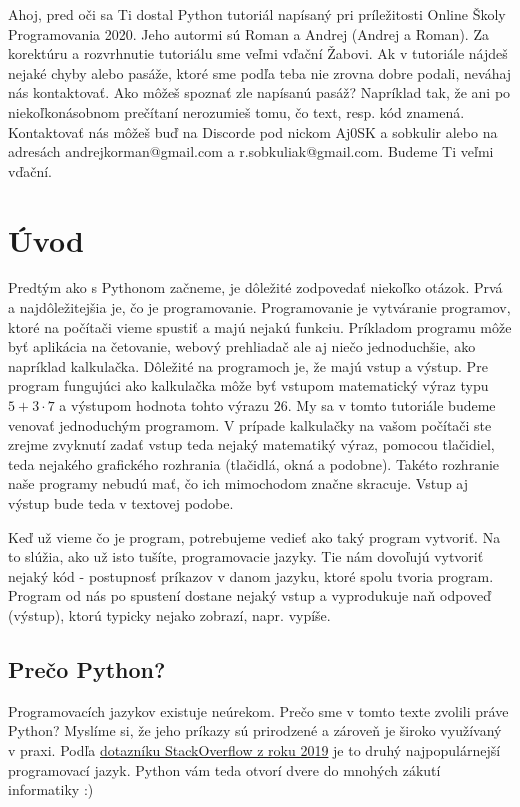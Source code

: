 

\usepackage{hyperref}
\hypersetup{
    colorlinks=true,
    linkcolor=blue,
    filecolor=magenta,      
    urlcolor=blue,
}


\tableofcontents
\newpage

Ahoj, pred oči sa Ti dostal Python tutoriál napísaný pri príležitosti Online Školy Programovania 2020. Jeho autormi sú Roman a Andrej (Andrej a Roman). Za korektúru a rozvrhnutie tutoriálu sme veľmi vďační Žabovi. Ak v tutoriále nájdeš nejaké chyby alebo pasáže, ktoré sme podľa teba nie zrovna dobre podali, neváhaj nás kontaktovať. Ako môžeš spoznať zle napísanú pasáž? Napríklad tak, že ani po niekoľkonásobnom prečítaní nerozumieš tomu, čo text, resp. kód znamená. Kontaktovať nás môžeš buď na Discorde pod nickom Aj0SK a sobkulir alebo na adresách andrejkorman@gmail.com a r.sobkuliak@gmail.com. Budeme Ti veľmi vďační.

\section{Úvod}
Predtým ako s Pythonom začneme, je dôležité zodpovedať niekoľko otázok. Prvá a najdôležitejšia je, čo je programovanie. Programovanie je vytváranie programov, ktoré na počítači vieme spustiť a majú nejakú funkciu. Príkladom programu môže byť aplikácia na četovanie, webový prehliadač ale aj niečo jednoduchšie, ako napríklad kalkulačka. Dôležité na programoch je, že majú vstup a výstup. Pre program fungujúci ako kalkulačka môže byť vstupom matematický výraz typu $5+3\cdot 7$ a výstupom hodnota tohto výrazu $26$. My sa v tomto tutoriále budeme venovať jednoduchým programom. V prípade kalkulačky na vašom počítači ste zrejme zvyknutí zadať vstup teda nejaký matematiký výraz, pomocou tlačidiel, teda nejakého grafického rozhrania (tlačidlá, okná a podobne). Takéto rozhranie naše programy nebudú mať, čo ich mimochodom značne skracuje. Vstup aj výstup bude teda v textovej podobe.

Keď už vieme čo je program, potrebujeme vedieť ako taký program vytvoriť. Na to slúžia, ako už isto tušíte, programovacie jazyky. Tie nám dovoľujú vytvoriť nejaký kód - postupnosť príkazov v danom jazyku, ktoré spolu tvoria program. Program od nás po spustení dostane nejaký vstup a vyprodukuje naň odpoveď (výstup), ktorú typicky nejako zobrazí, napr. vypíše.

\subsection{Prečo Python?}
Programovacích jazykov existuje neúrekom. Prečo sme v tomto texte zvolili práve Python? Myslíme si, že jeho príkazy sú prirodzené a zároveň je široko využívaný v praxi. Podľa \href{https://insights.stackoverflow.com/survey/2019#technology-_-programming-scripting-and-markup-languages}{dotazníku StackOverflow z roku 2019} je to druhý najpopulárnejší programovací jazyk. Python vám teda otvorí dvere do mnohých zákutí informatiky :)

